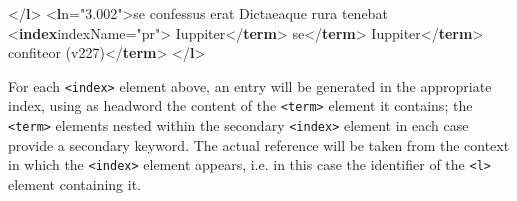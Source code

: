 \documentclass[11pt,twoside]{article}\makeatletter
\begin{document}
\begin{shaded}
\mbox{}\newline 
{</\textbf{l}>}\mbox{}\newline 
{<\textbf{l}\hspace*{6pt}n="{3.002}">}se confessus erat Dictaeaque rura tenebat\mbox{}\newline 
{<\textbf{index}\hspace*{6pt}indexName="{pr}">}\mbox{}\newline 
\hspace*{6pt}Iuppiter{</\textbf{term}>}\mbox{}\newline 
\hspace*{6pt}\mbox{}\newline 
\hspace*{6pt}\hspace*{6pt}se{</\textbf{term}>}\mbox{}\newline 
\hspace*{6pt}\mbox{}\newline 
{}\mbox{}\newline 
{}\mbox{}\newline 
\hspace*{6pt}Iuppiter{</\textbf{term}>}\mbox{}\newline 
\hspace*{6pt}\mbox{}\newline 
\hspace*{6pt}\hspace*{6pt}confiteor (v227){</\textbf{term}>}\mbox{}\newline 
\hspace*{6pt}\mbox{}\newline 
{}\mbox{}\newline 
{</\textbf{l}>}\end{shaded}\egroup\par \noindent   For each \texttt{<index>} element above, an entry will be generated in the appropriate index, using  as headword the content of the \texttt{<term>} element it contains; the \texttt{<term>} elements nested within the secondary \texttt{<index>} element in each case provide a secondary keyword. The actual reference will be taken from the context in which the \texttt{<index>} element appears, i.e. in this case the identifier of the \texttt{<l>} element containing it. 
\end{document}
